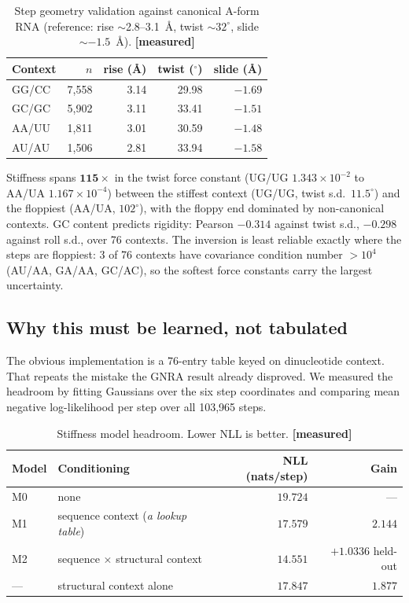 \documentclass[11pt,a4paper]{article}
\newcommand{\meas}{\textcolor{measured}{\textbf{[measured]}}}
\begin{document}
\begin{table}[h]
\centering
\caption{Step geometry validation against canonical A-form RNA
(reference: rise $\sim$2.8--3.1~\AA{}, twist $\sim32^\circ$, slide $\sim-1.5$~\AA{}). \meas}
\small
\begin{tabular}{@{}lrrrr@{}}
\toprule
\textbf{Context} & \textbf{$n$} & \textbf{rise (\AA)} & \textbf{twist ($^\circ$)} & \textbf{slide (\AA)} \\
\midrule
GG/CC & 7{,}558 & 3.14 & 29.98 & $-1.69$ \\
GC/GC & 5{,}902 & 3.11 & 33.41 & $-1.51$ \\
AA/UU & 1{,}811 & 3.01 & 30.59 & $-1.48$ \\
AU/AU & 1{,}506 & 2.81 & 33.94 & $-1.58$ \\
\bottomrule
\end{tabular}
\end{table}

Stiffness spans $\mathbf{115\times}$ in the twist force constant (UG/UG $1.343\times10^{-2}$ to AA/UA $1.167\times10^{-4}$) between the stiffest context (UG/UG, twist
s.d.\ $11.5^\circ$) and the floppiest (AA/UA, $102^\circ$), with the floppy end
dominated by non-canonical contexts. GC content predicts rigidity: Pearson
$-0.314$ against twist s.d., $-0.298$ against roll s.d., over 76 contexts. The inversion is least reliable exactly where the steps are floppiest: 3 of 76 contexts have covariance condition number $>10^4$ (AU/AA, GA/AA, GC/AC), so the softest force constants carry the largest uncertainty.

\subsection{Why this must be learned, not tabulated}
\label{sec:stiffenc}

The obvious implementation is a 76-entry table keyed on dinucleotide context.
That repeats the mistake the GNRA result already disproved. We measured the
headroom by fitting Gaussians over the six step coordinates and comparing mean
negative log-likelihood per step over all 103{,}965 steps.

\begin{table}[h]
\centering
\caption{Stiffness model headroom. Lower NLL is better. \meas}
\label{tab:headroom}
\small
\begin{tabular}{@{}llrr@{}}
\toprule
\textbf{Model} & \textbf{Conditioning} & \textbf{NLL (nats/step)} & \textbf{Gain} \\
\midrule
M0 & none & $19.724$ & --- \\
M1 & sequence context (\emph{a lookup table}) & $17.579$ & $2.144$ \\
M2 & sequence $\times$ structural context & $\mathbf{14.551}$ & $\mathbf{+1.0336}$ held-out \\
--- & structural context alone & $17.847$ & $1.877$ \\
\bottomrule
\end{tabular}
\end{table}
\end{document}
